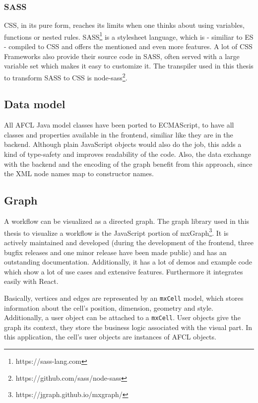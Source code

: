 \documentclass[a4paper,11pt,pdftex,halfparskip,cleardoubleempty,bibtotoc,liststotoc]{scrbook}
\begin{document}
\subsubsection{SASS}

CSS, in its pure form, reaches its limits when one thinks about using variables, functions or nested rules. SASS\footnote{https://sass-lang.com} is a stylesheet language, which is - similiar to ES - compiled to CSS and offers the mentioned and even more features.
A lot of CSS Frameworks also provide their source code in SASS, often served with a large variable set which makes it easy to customize it. The transpiler used in this thesis to transform SASS to CSS is node-sass\footnote{https://github.com/sass/node-sass}.

\subsection{Data model}

All AFCL Java model classes have been ported to ECMAScript, to have all classes and properties available in the frontend, similiar like they are in the backend. Although plain JavaScript objects would also do the job, this adds a kind of type-safety and improves readability of the code. Also, the data exchange with the backend and the encoding of the graph benefit from this approach, since the XML node names map to constructor names.

\subsection{Graph}

A workflow can be visualized as a directed graph.
The graph library used in this thesis to visualize a workflow is the JavaScript portion of mxGraph\footnote{https://jgraph.github.io/mxgraph/}. It is actively maintained and developed (during the development of the frontend, three bugfix releases and one minor release have been made public) and has an outstanding documentation. Additionally, it has a lot of demos and example code which show a lot of use cases and extensive features. Furthermore it integrates easily with React.

Basically, vertices and edges are represented by an \texttt{mxCell} model, which stores information about the cell's position, dimension, geometry and style.
Additionally, a user object can be attached to a \texttt{mxCell}. User objects give the graph its context, they store the business logic associated with the visual part. In this application, the cell's user objects are instances of AFCL objects.
\end{document}
